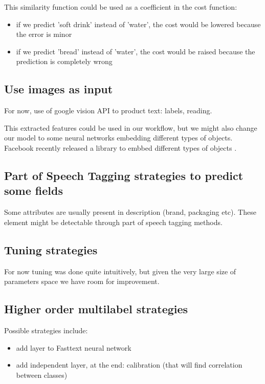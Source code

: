 This similarity function could be used as a coefficient in the cost function: 
\begin{itemize}
	\item if we predict 'soft drink' instead of 'water', the cost would be lowered because the error is minor
	\item if we predict 'bread' instead of 'water', the cost would be raised because the prediction is completely wrong
\end{itemize}

\subsection{Use images as input}

For now, use of google vision API to product text: labels, reading. 

This extracted features could be used in our workflow, but we might also change our model to some neural networks embedding different types of objects. Facebook recently released a library to embbed different types of objects \cite[starspace]{wu2017starspace}.


\subsection{Part of Speech Tagging strategies to predict some fields}
Some attributes are usually present in description (brand, packaging etc). These element might be detectable through part of speech tagging methods.

\subsection{Tuning strategies}

For now tuning was done quite intuitively, but given the very large size of parameters space we have room for improvement.

\subsection{Higher order multilabel strategies}
Possible strategies include:
\begin{itemize}
	\item add layer to Fasttext neural network
	\item add independent layer, at the end: calibration (that will find correlation between classes)
\end{itemize}

